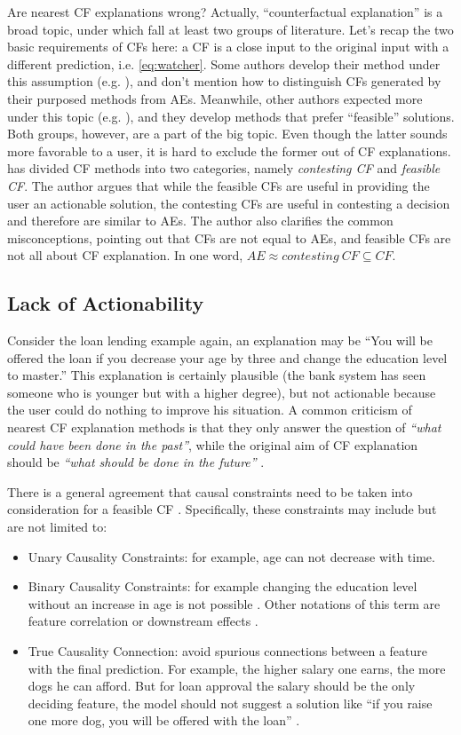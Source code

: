 Are nearest CF explanations wrong? Actually, ``counterfactual explanation'' is a broad topic, under which fall at least two groups of literature. Let's recap the two basic requirements of CFs here: a CF is a close input to the original input with a different prediction, i.e. \autoref{eq:watcher}. Some authors develop their method under this assumption (e.g. \cite{certifai,watcher2017,DiCE}), and don't mention how to distinguish CFs generated by their purposed methods from AEs. Meanwhile, other authors expected more under this topic (e.g. \cite{prototype}), and they develop methods that prefer ``feasible'' solutions. Both groups, however, are a part of the big topic. Even though the latter sounds more favorable to a user, it is hard to exclude the former out of CF explanations. \citeauthor{CFandAE} \cite{CFandAE} has divided CF methods into two categories, namely \emph{contesting CF} and \emph{feasible CF}. The author argues that while the feasible CFs are useful in providing the user an actionable solution, the contesting CFs are useful in contesting a decision and therefore are similar to AEs. The author also clarifies the common misconceptions, pointing out that CFs are not equal to AEs, and feasible CFs are not all about CF explanation. In one word, $AE\approx contesting\ CF\subseteq CF$.
 \subsection{Lack of Actionability}
Consider the loan lending example again, an explanation may be ``You will be offered the loan if you decrease your age by three and change the education level to master.'' This explanation is certainly plausible (the bank system has seen someone who is younger but with a higher degree), but not actionable because the user could do nothing to improve his situation. A common criticism of nearest CF explanation methods is that they only answer the question of \emph{``what could have been done in the past''}, while the original aim of CF explanation should be \emph{``what should be done in the future''} \cite{algorithmicrecourse}.

There is a general agreement that causal constraints need to be taken into consideration for a feasible CF \cite{algorithmicrecourse}. Specifically, these constraints may include but are not limited to:
 \begin{itemize}
   \item Unary Causality Constraints: for example, age can not decrease with time.
   \item Binary Causality Constraints: for example changing the education level without an increase in age is not possible \cite{DiCE}. Other notations of this term are feature correlation \cite{preservingCausal} or downstream effects \cite{algorithmicrecourse}.
   \item True Causality Connection: avoid spurious connections between a feature with the final prediction. For example, the higher salary one earns, the more dogs he can afford. But for loan approval the salary should be the only deciding feature, the model should not suggest a solution like ``if you raise one more dog, you will be offered with the loan'' \cite{diffThatMakesDiff}.
 \end{itemize}

